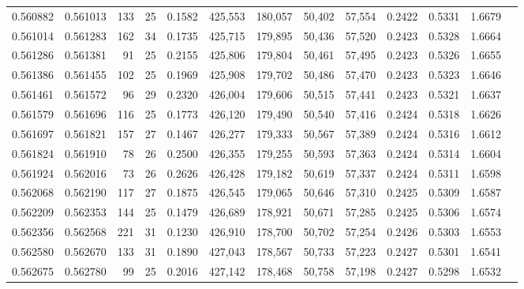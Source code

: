 \begin{tabular}{rrrrrrrrrrrrr}
0.560882 & 0.561013 &   133 &  25 &                                     0.1582 & 425,553 & 180,057 &  50,402 &  57,554 & 0.2422 & 0.5331 & 1.6679 \\
0.561014 & 0.561283 &   162 &  34 &                                     0.1735 & 425,715 & 179,895 &  50,436 &  57,520 & 0.2423 & 0.5328 & 1.6664 \\
0.561286 & 0.561381 &    91 &  25 &                                     0.2155 & 425,806 & 179,804 &  50,461 &  57,495 & 0.2423 & 0.5326 & 1.6655 \\
0.561386 & 0.561455 &   102 &  25 &                                     0.1969 & 425,908 & 179,702 &  50,486 &  57,470 & 0.2423 & 0.5323 & 1.6646 \\
0.561461 & 0.561572 &    96 &  29 &                                     0.2320 & 426,004 & 179,606 &  50,515 &  57,441 & 0.2423 & 0.5321 & 1.6637 \\
0.561579 & 0.561696 &   116 &  25 &                                     0.1773 & 426,120 & 179,490 &  50,540 &  57,416 & 0.2424 & 0.5318 & 1.6626 \\
0.561697 & 0.561821 &   157 &  27 &                                     0.1467 & 426,277 & 179,333 &  50,567 &  57,389 & 0.2424 & 0.5316 & 1.6612 \\
0.561824 & 0.561910 &    78 &  26 &                                     0.2500 & 426,355 & 179,255 &  50,593 &  57,363 & 0.2424 & 0.5314 & 1.6604 \\
0.561924 & 0.562016 &    73 &  26 &                                     0.2626 & 426,428 & 179,182 &  50,619 &  57,337 & 0.2424 & 0.5311 & 1.6598 \\
0.562068 & 0.562190 &   117 &  27 &                                     0.1875 & 426,545 & 179,065 &  50,646 &  57,310 & 0.2425 & 0.5309 & 1.6587 \\
0.562209 & 0.562353 &   144 &  25 &                                     0.1479 & 426,689 & 178,921 &  50,671 &  57,285 & 0.2425 & 0.5306 & 1.6574 \\
0.562356 & 0.562568 &   221 &  31 &                                     0.1230 & 426,910 & 178,700 &  50,702 &  57,254 & 0.2426 & 0.5303 & 1.6553 \\
0.562580 & 0.562670 &   133 &  31 &                                     0.1890 & 427,043 & 178,567 &  50,733 &  57,223 & 0.2427 & 0.5301 & 1.6541 \\
0.562675 & 0.562780 &    99 &  25 &                                     0.2016 & 427,142 & 178,468 &  50,758 &  57,198 & 0.2427 & 0.5298 & 1.6532 \\

\end{tabular}
